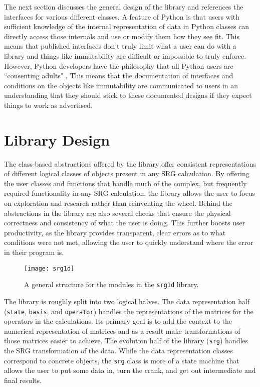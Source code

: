 The next section discusses the general design of the library and references the interfaces for various different classes. A feature of Python is that users with sufficient knowledge of the internal representation of data in Python classes can directly access those internals and use or modify them how they see fit. This means that published interfaces don't truly limit what a user can do with a library and things like immutability are difficult or impossible to truly enforce. However, Python developers have the philosophy that all Python users are ``consenting adults" \cite{consentingAdults}. This means that the documentation of interfaces and conditions on the objects like immutability are communicated to users in an understanding that they should stick to these documented designs if they expect things to work as advertised.

\section{Library Design}

The class-based abstractions offered by the library offer consistent representations of different logical classes of objects present in any SRG calculation. By offering the user classes and functions that handle much of the complex, but frequently required functionality in any SRG calculation, the library allows the user to focus on exploration and research rather than reinventing the wheel. Behind the abstractions in the library are also several checks that ensure the physical correctness and consistency of what the user is doing. This further boosts user productivity, as the library provides transparent, clear errors as to what conditions were not met, allowing the user to quickly understand where the error in their program is.

\begin{figure}[th!]
\begin{center}
\texttt{[image: srg1d]}
\end{center}
\caption{A general structure for the modules in the \texttt{srg1d} library.}
\label{fig:srg1d}
\end{figure}

The library is roughly split into two logical halves. The data representation half (\texttt{state}, \texttt{basis}, and \texttt{operator}) handles the representations of the matrices for the operators in the calculations. Its primary goal is to add the context to the numerical representation of matrices and as a result make transformations of those matrices easier to achieve. The evolution half of the library (\texttt{srg}) handles the SRG transformation of the data. While the data representation classes correspond to concrete objects, the \texttt{srg} class is more of a state machine that allows the user to put some data in, turn the crank, and get out intermediate and final results.

